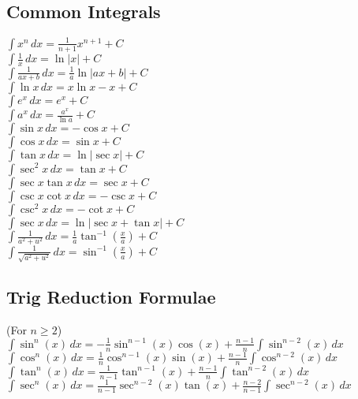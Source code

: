 \documentclass[10pt,landscape,letterpaper]{cheatsheet}
\begin{document}
\subsection*{Common Integrals}
$ \int x^n \,dx = \frac{1}{n+1}x^{n+1} + C $ \\
$ \int \frac{1}{x} \,dx = \ln{\left\lvert x \right\rvert} + C $ \\
$ \int \frac{1}{ax+b} \,dx = \frac{1}{a} \ln{\left\lvert ax+b \right\rvert } + C $ \\
$ \int \ln{x} \,dx = x\ln{x} - x + C $ \\
$ \int e^x \,dx = e^x + C $ \\
$ \int a^x \,dx = \frac{a^x}{\ln{a}} + C $ \\
$ \int \sin{x} \,dx = -\cos{x} + C $ \\
$ \int \cos{x} \,dx = \sin{x} + C $ \\
$ \int \tan{x} \,dx = \ln{\left\lvert \sec{x} \right\rvert} + C $ \\
$ \int \sec^2{x} \,dx = \tan{x} + C $ \\
$ \int \sec{x}\tan{x} \,dx = \sec{x} + C $ \\
$ \int \csc{x}\cot{x} \,dx = -\csc{x} + C $ \\
$ \int \csc^2{x} \,dx = -\cot{x} + C $ \\
$ \int \sec{x} \,dx = \ln{\left\lvert \sec{x} + \tan{x} \right\rvert} + C $ \\
$ \int \frac{1}{a^2+u^2} \,dx = \frac{1}{a}\tan^{-1}\left({\frac{x}{a}}\right) + C $ \\
$ \int \frac{1}{\sqrt{a^2+u^2}} \,dx = \sin^{-1}\left({\frac{x}{a}}\right) + C $ \\

\subsection*{Trig Reduction Formulae} (For $n \geq 2$) \\
$\int \sin^n(x) \,dx = -\frac{1}{n}\sin^{n-1}(x)\cos(x)+\frac{n-1}{n}\int \sin^{n-2}(x) \,dx$\\
$\int \cos^n(x) \,dx = \frac{1}{n}\cos^{n-1}(x)\sin(x)+\frac{n-1}{n}\int \cos^{n-2}(x) \,dx$\\
$\int \tan^n(x) \,dx = \frac{1}{n-1}\tan^{n-1}(x)+\frac{n-1}{n}\int \tan^{n-2}(x) \,dx$\\
$\int \sec^n(x) \,dx = \frac{1}{n-1}\sec^{n-2}(x)\tan(x)+\frac{n-2}{n-1}\int \sec^{n-2}(x) \,dx$\\
\end{document}
